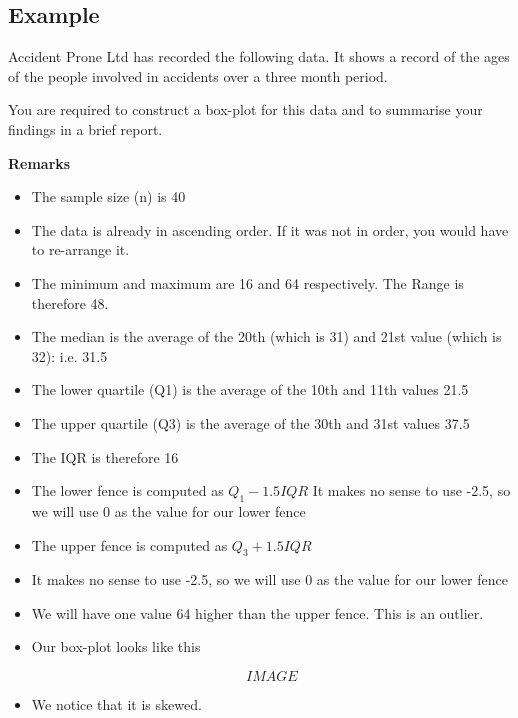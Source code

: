 \subsection{Example}
Accident Prone Ltd has recorded the following data. It shows a record of the ages of the people involved in accidents over a three month period.

You are required to construct a box-plot for this data and to summarise your findings in a brief report.


\noindent \textbf{Remarks }


\begin{itemize}
\item The sample size (n) is 40
\item The data is already in ascending order. If it was not in order, you would have to re-arrange it.

\item The minimum and maximum are 16 and 64 respectively. The Range is therefore 48.

\item The median is the average of the 20th (which is 31) and 21st value (which is 32): i.e. 31.5

\item The lower quartile (Q1) is the average of the 10th and 11th values 21.5

\item The upper quartile (Q3) is the average of the 30th and 31st values 37.5

\item The IQR is therefore 16

\item The lower fence is computed as $Q_1 - 1.5IQR$
It makes no sense to use -2.5, so we will use 0 as the value for our lower fence

\item The upper fence is computed as $Q_3 + 1.5IQR$

\item It makes no sense to use -2.5, so we will use 0 as the value for our lower fence

\item We will have one value  64 higher than the upper fence. This is an outlier.
\item Our box-plot looks like this

\[ IMAGE \]

\item We notice that it is skewed. 

\end{itemize}

